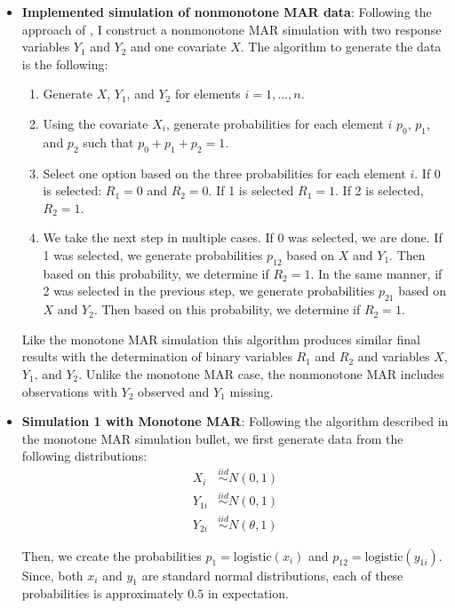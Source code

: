 \documentclass[12pt]{article}
\newcommand{\logistic}{{\text{logistic}}}
\begin{document}
\begin{itemize}
  \item \textbf{Implemented simulation of nonmonotone MAR data}: 
  Following the approach
    of \cite{robins1997non}, I construct a nonmonotone MAR simulation with two 
    response variables $Y_1$ and $Y_2$ and one covariate $X$. The algorithm to
    generate the data is the following:
    \begin{enumerate}
        \item Generate $X$, $Y_1$, and $Y_2$ for elements $i = 1, \dots, n$.
        \item Using the covariate $X_i$, generate probabilities for each element
          $i$ $p_0$, $p_1$, and $p_2$ such that $p_0 + p_1 + p_2 = 1$. 
        \item Select one option based on the three probabilities for each
          element $i$. If 0 is selected: $R_1 = 0$ and $R_2 = 0$. If 1 is
          selected $R_1 = 1$. If 2 is selected, $R_2 = 1$.
        \item We take the next step in multiple cases. If 0 was selected, we are
          done. If 1 was selected, we generate probabilities $p_{12}$ based on
          $X$ and $Y_1$. Then based on this probability, we determine if $R_2 =
          1$. In the same manner, if 2 was selected in the previous step, we
          generate probabilities $p_{21}$ based on $X$ and $Y_2$. Then based on
          this probability, we determine if $R_2 = 1$.
    \end{enumerate}
    Like the monotone MAR simulation this algorithm produces similar final
    results with the determination of binary variables $R_1$ and $R_2$ and
    variables $X$, $Y_1$, and $Y_2$. Unlike the monotone MAR case, the
    nonmonotone MAR includes observations with $Y_2$ observed and $Y_1$ missing.
    
  \item \textbf{Simulation 1 with Monotone MAR}:
    Following the algorithm described in the monotone MAR simulation bullet, 
    we first generate data from the following distributions:
    \begin{align*}
        X_i &\stackrel{iid}{\sim} N(0, 1) \\
        Y_{1i} &\stackrel{iid}{\sim} N(0, 1)\\
        Y_{2i} &\stackrel{iid}{\sim} N(\theta, 1)
    \end{align*}

    Then, we create the probabilities $p_1 = \logistic(x_i)$ and 
    $p_{12} = \logistic(y_{1i})$.
    Since, both $x_i$ and $y_1$ are standard normal distributions, each of these
    probabilities is approximately $0.5$ in expectation.


\end{itemize}
\end{document}
